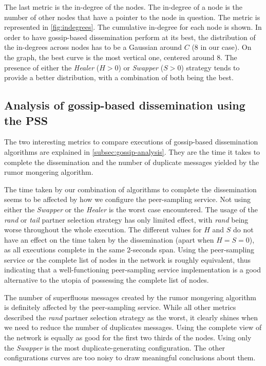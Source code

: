 \documentclass[11pt,a4paper]{scrartcl}
\begin{document}
The last metric is the in-degree of the nodes. The in-degree of a node is the number of other nodes that have a pointer to the node in question. The metric is represented in \autoref{fig:indegrees}. The cumulative in-degree for each node is shown. In order to have gossip-based dissemination perform at its best, the distribution of the in-degrees across nodes has to be a Gaussian around $C$ (8 in our case). On the graph, the best curve is the most vertical one, centered around 8. The presence of either the \textit{Healer} ($H>0$) or \textit{Swapper} ($S>0$) strategy tends to provide a better distribution, with a combination of both being the best.

\subsection{Analysis of gossip-based dissemination using the PSS}

The two interesting metrics to compare executions of gossip-based dissemination algorithms are explained in \autoref{subsec:gossip-analysis}. They are the time it takes to complete the dissemination and the number of duplicate messages yielded by the rumor mongering algorithm.

The time taken by our combination of algorithms to complete the dissemination seems to be affected by how we configure the peer-sampling service. Not using either the \textit{Swapper} or the \textit{Healer} is the worst case encountered. The usage of the \textit{rand} or \textit{tail} partner selection strategy has only limited effect, with \textit{rand} being worse throughout the whole execution. The different values for $H$ and $S$ do not have an effect on the time taken by the dissemination (apart when $H=S=0$), as all executions complete in the same 2-seconds span. Using the peer-sampling service or the complete list of nodes in the network is roughly equivalent, thus indicating that a well-functioning peer-sampling service implementation is a good alternative to the utopia of possessing the complete list of nodes.

The number of superfluous messages created by the rumor mongering algorithm is definitely affected by the peer-sampling service. While all other metrics described the \textit{rand} partner selection strategy as the worst, it clearly shines when we need to reduce the number of duplicates messages. Using the complete view of the network is equally as good for the first two thirds of the nodes. Using only the \textit{Swapper} is the most duplicate-generating configuration. The other configurations curves are too noisy to draw meaningful conclusions about them.
\end{document}
